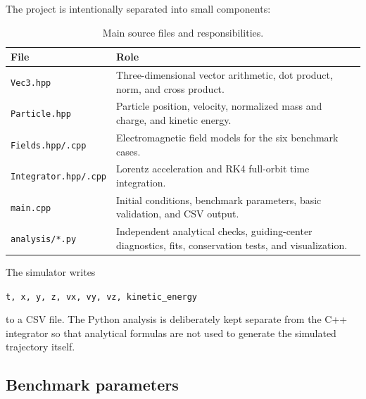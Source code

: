 \documentclass[11pt,a4paper]{article}
\begin{document}
The project is intentionally separated into small components:
\begin{table}[H]
    \centering
    \caption{Main source files and responsibilities.}
    \begin{tabular}{p{}p{}}
        \toprule
        \textbf{File} & \textbf{Role} \\
        \midrule
        \texttt{Vec3.hpp} & Three-dimensional vector arithmetic, dot product, norm, and cross product. \\
        \texttt{Particle.hpp} & Particle position, velocity, normalized mass and charge, and kinetic energy. \\
        \texttt{Fields.hpp/.cpp} & Electromagnetic field models for the six benchmark cases. \\
        \texttt{Integrator.hpp/.cpp} & Lorentz acceleration and RK4 full-orbit time integration. \\
        \texttt{main.cpp} & Initial conditions, benchmark parameters, basic validation, and CSV output. \\
        \texttt{analysis/*.py} & Independent analytical checks, guiding-center diagnostics, fits, conservation tests, and visualization. \\
        \bottomrule
    \end{tabular}
\end{table}

The simulator writes
\begin{center}
\texttt{t, x, y, z, vx, vy, vz, kinetic\_energy}
\end{center}
to a CSV file. The Python analysis is deliberately kept separate from the C++ integrator so that analytical formulas are not used to generate the simulated trajectory itself.

\subsection{Benchmark parameters}
\end{document}
